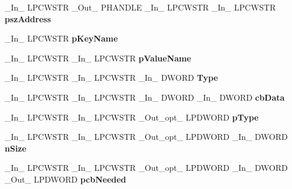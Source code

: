 \begin{DoxyCompactItemize}
\mbox{\label{struct___p_r_i_n_t_p_r_o_v_i_d_o_r_aa8caf8c284ea5497e70cdca98178ceb0}} 
\+\_\+\+In\+\_\+ L\+P\+C\+W\+S\+TR \+\_\+\+Out\+\_\+ P\+H\+A\+N\+D\+LE \+\_\+\+In\+\_\+ L\+P\+C\+W\+S\+TR \+\_\+\+In\+\_\+ L\+P\+C\+W\+S\+TR {\bfseries psz\+Address}
\item 
\mbox{\label{struct___p_r_i_n_t_p_r_o_v_i_d_o_r_a57d6a5e050bb35dc0cb86af9aa54c7c1}} 
\+\_\+\+In\+\_\+ L\+P\+C\+W\+S\+TR {\bfseries p\+Key\+Name}
\item 
\mbox{\label{struct___p_r_i_n_t_p_r_o_v_i_d_o_r_ae1ae532a4d14d0b9cc8f4f00e6896a6a}} 
\+\_\+\+In\+\_\+ L\+P\+C\+W\+S\+TR \+\_\+\+In\+\_\+ L\+P\+C\+W\+S\+TR {\bfseries p\+Value\+Name}
\item 
\mbox{\label{struct___p_r_i_n_t_p_r_o_v_i_d_o_r_a77c30b8e0a0e8a03df181c3652632c54}} 
\+\_\+\+In\+\_\+ L\+P\+C\+W\+S\+TR \+\_\+\+In\+\_\+ L\+P\+C\+W\+S\+TR \+\_\+\+In\+\_\+ D\+W\+O\+RD {\bfseries Type}
\item 
\mbox{\label{struct___p_r_i_n_t_p_r_o_v_i_d_o_r_a077a8837686638a24509cdd5f764bcf3}} 
\+\_\+\+In\+\_\+ L\+P\+C\+W\+S\+TR \+\_\+\+In\+\_\+ L\+P\+C\+W\+S\+TR \+\_\+\+In\+\_\+ D\+W\+O\+RD \+\_\+\+In\+\_\+ D\+W\+O\+RD {\bfseries cb\+Data}
\item 
\mbox{\label{struct___p_r_i_n_t_p_r_o_v_i_d_o_r_a8408650314cafe5fcd13d6b3f1175bce}} 
\+\_\+\+In\+\_\+ L\+P\+C\+W\+S\+TR \+\_\+\+In\+\_\+ L\+P\+C\+W\+S\+TR \+\_\+\+Out\+\_\+opt\+\_\+ L\+P\+D\+W\+O\+RD {\bfseries p\+Type}
\item 
\mbox{\label{struct___p_r_i_n_t_p_r_o_v_i_d_o_r_ac0283e04a6a7ff557ba4a1f82e79a1f9}} 
\+\_\+\+In\+\_\+ L\+P\+C\+W\+S\+TR \+\_\+\+In\+\_\+ L\+P\+C\+W\+S\+TR \+\_\+\+Out\+\_\+opt\+\_\+ L\+P\+D\+W\+O\+RD \+\_\+\+In\+\_\+ D\+W\+O\+RD {\bfseries n\+Size}
\item 
\mbox{\label{struct___p_r_i_n_t_p_r_o_v_i_d_o_r_ae4446538553f6c8e6fffb2802499dec1}} 
\+\_\+\+In\+\_\+ L\+P\+C\+W\+S\+TR \+\_\+\+In\+\_\+ L\+P\+C\+W\+S\+TR \+\_\+\+Out\+\_\+opt\+\_\+ L\+P\+D\+W\+O\+RD \+\_\+\+In\+\_\+ D\+W\+O\+RD \+\_\+\+Out\+\_\+ L\+P\+D\+W\+O\+RD {\bfseries pcb\+Needed}

\end{DoxyCompactItemize}
